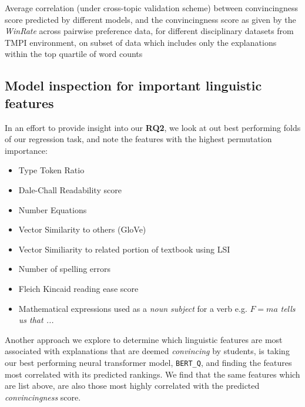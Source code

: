 \documentclass[notitlepage,12pt]{jedm}
\begin{document}
\begin{table}
	\parbox{.45\linewidth}{
		\centering
		
	}
	\hfill
	\parbox{.45\linewidth}{
		\centering
		
	}
	\caption{
		Average correlation (under cross-topic validation scheme) between 
		convincingness score predicted by different models, and the 
		convincingness score as given by the \textit{WinRate} across pairwise 
		preference data, for different disciplinary datasets from TMPI 
		environment, on subset of data which includes only the explanations 
		within the top quartile of word counts
	}
	\label{tab:dalite_BT_longest}
\end{table}


\subsection{Model inspection for important linguistic features}
In an effort to provide insight into our \textbf{RQ2}, we look at out best 
performing folds of our regression task, and note the features with the highest 
permutation importance:

\begin{itemize}
	\item Type Token Ratio
	\item Dale-Chall Readability score
	\item Number Equations
	\item Vector Similarity to others (GloVe)
	\item Vector Similiarity to related portion of textbook using LSI
	\item Number of spelling errors
	\item Fleich Kincaid reading ease score
	\item Mathematical expressions used as a \textit{noun subject} for a verb  
	e.g. $F=ma$ \textit{tells us that ...}
\end{itemize}

Another approach we explore to determine which linguistic features are most 
associated with explanations that are deemed \textit{convincing} by students, 
is taking our best performing neural transformer model, \verb|BERT_Q|, and 
finding the features most correlated with its predicted rankings. 
We find that the same features which are list above, are also those most highly 
correlated with the predicted \textit{convincingness} score.
\end{document}
